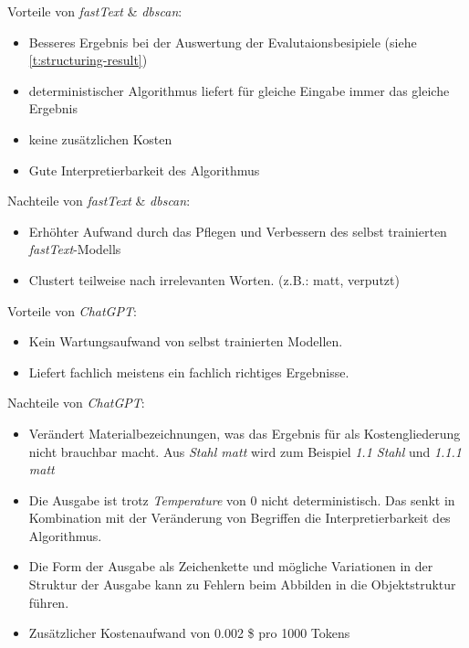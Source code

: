 \noindent Vorteile von \textit{fastText} \& \textit{\ac{dbscan}}:
\begin{itemize}
	\setlength\itemsep{0em}
	\item Besseres Ergebnis bei der Auswertung der Evalutaionsbesipiele (siehe \autoref{t:structuring-result})
	\item deterministischer Algorithmus liefert für gleiche Eingabe immer das gleiche Ergebnis
	\item keine zusätzlichen Kosten
	\item Gute Interpretierbarkeit des Algorithmus
\end{itemize}
Nachteile von \textit{fastText} \& \textit{\ac{dbscan}}:
\begin{itemize}
	\setlength\itemsep{0em}
	\item Erhöhter Aufwand durch das Pflegen und Verbessern des selbst trainierten \textit{fastText}-Modells
	\item Clustert teilweise nach irrelevanten Worten. (z.B.: matt, verputzt)
\end{itemize}
Vorteile von \textit{ChatGPT}:
\begin{itemize}
	\setlength\itemsep{0em}
	\item Kein Wartungsaufwand von selbst trainierten Modellen.
	\item Liefert fachlich meistens ein fachlich richtiges Ergebnisse.
\end{itemize}
Nachteile von \textit{ChatGPT}:
\begin{itemize}
	\setlength\itemsep{0em}
	\item Verändert Materialbezeichnungen, was das Ergebnis für als Kostengliederung nicht brauchbar macht. Aus \textit{Stahl matt} wird zum Beispiel \textit{1.1 Stahl} und \textit{1.1.1 matt}
	\item Die Ausgabe ist trotz \textit{Temperature} von 0 nicht deterministisch. Das senkt in Kombination mit der Veränderung von Begriffen die Interpretierbarkeit des Algorithmus.
	\item Die Form der Ausgabe als Zeichenkette und mögliche Variationen in der Struktur der Ausgabe kann zu Fehlern beim Abbilden in die Objektstruktur führen.
	\item Zusätzlicher Kostenaufwand von 0.002 \$ pro 1000 Tokens
\end{itemize}
